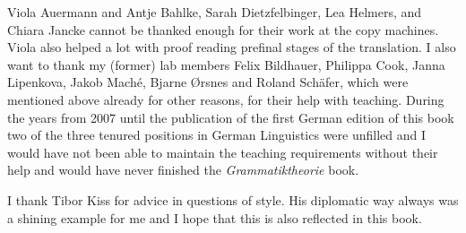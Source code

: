 Viola Auermann and Antje Bahlke, Sarah Dietzfelbinger, Lea Helmers, and Chiara Jancke cannot be thanked enough for their work at the copy machines. Viola
also helped a lot with proof reading prefinal stages of the translation.
I also want to thank my (former) lab members Felix Bildhauer, Philippa Cook, Janna Lipenkova, Jakob Maché,
Bjarne Ørsnes and Roland Schäfer, which were mentioned above already
for other reasons, for their help with teaching. During the years from 2007 until the publication of
the first German edition of this book two of the three tenured positions in German Linguistics were
unfilled and I would have not been able to maintain the teaching requirements without their help and
would have never finished the \emph{Grammatiktheorie} book.

I thank Tibor Kiss for advice in questions of style. His diplomatic way always was a shining
example for me and I hope that this is also reflected in this book.

